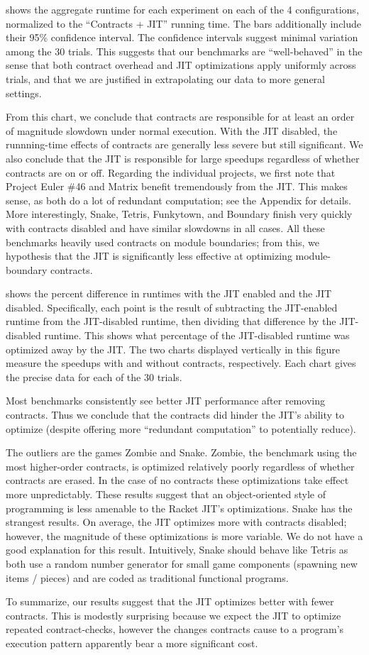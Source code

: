 

 shows the aggregate runtime for each experiment on each of the 4 configurations, normalized to the ``Contracts + JIT'' running time.
The bars additionally include their 95\% confidence interval.
The confidence intervals suggest minimal variation among the 30 trials.
This suggests that our benchmarks are ``well-behaved'' in the sense that both contract overhead and JIT optimizations apply uniformly across trials, and that we are justified in extrapolating our data to more general settings.

From this chart, we conclude that contracts are responsible for at least an order of magnitude slowdown under normal execution.
With the JIT disabled, the runnning-time effects of contracts are generally less severe but still significant.
We also conclude that the JIT is responsible for large speedups regardless of whether contracts are on or off.
Regarding the individual projects, we first note that Project Euler \#46 and Matrix benefit tremendously from the JIT.
This makes sense, as both do a lot of redundant computation; see the Appendix for details.
More interestingly, Snake, Tetris, Funkytown, and Boundary finish very quickly with contracts disabled and have similar slowdowns in all cases.
All these benchmarks heavily used contracts on module boundaries; from this, we hypothesis that the JIT is significantly less effective at optimizing module-boundary contracts.

\newpage


 shows the percent difference in runtimes with the JIT enabled and the JIT disabled.
Specifically, each point is the result of subtracting the JIT-enabled runtime from the JIT-disabled runtime, then dividing that difference by the JIT-disabled runtime.
This shows what percentage of the JIT-disabled runtime was optimized away by the JIT.
The two charts displayed vertically in this figure measure the speedups with and without contracts, respectively.
Each chart gives the precise data for each of the 30 trials.

\newpage

Most benchmarks consistently see better JIT performance after removing contracts.
Thus we conclude that the contracts did hinder the JIT's ability to optimize (despite offering more ``redundant computation'' to potentially reduce).

The outliers are the games Zombie and Snake.
Zombie, the benchmark using the most higher-order contracts, is optimized relatively poorly regardless of whether contracts are erased.
In the case of no contracts these optimizations take effect more unpredictably.
These results suggest that an object-oriented style of programming is less amenable to the Racket JIT's optimizations.
Snake has the strangest results.
On average, the JIT optimizes more with contracts disabled; however, the magnitude of these optimizations is more variable.
We do not have a good explanation for this result.
Intuitively, Snake should behave like Tetris as both use a random number generator for small game components (spawning new items / pieces) and are coded as traditional functional programs.

To summarize, our results suggest that the JIT optimizes better with fewer contracts.
This is modestly surprising because we expect the JIT to optimize repeated contract-checks, however the changes contracts cause to a program's execution pattern apparently bear a more significant cost.

